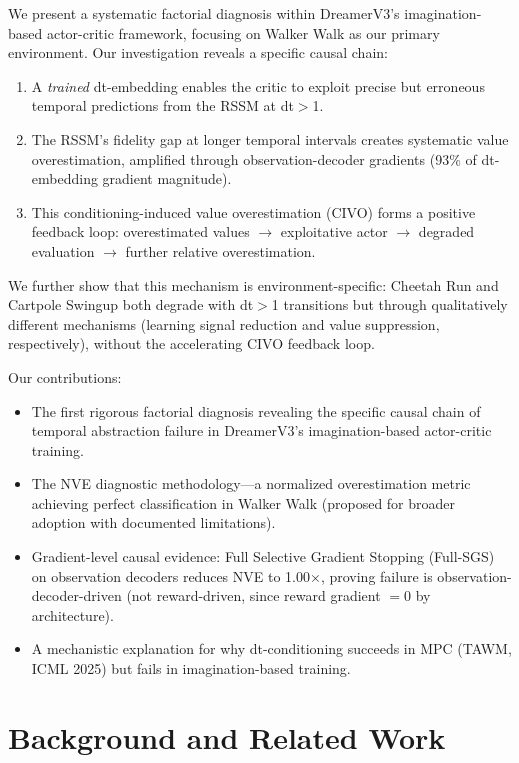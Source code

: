 \documentclass[10pt,letterpaper]{article}
\begin{document}
We present a systematic factorial diagnosis within DreamerV3's imagination-based actor-critic framework, focusing on Walker Walk as our primary environment. Our investigation reveals a specific causal chain:
\begin{enumerate}
    \item A \emph{trained} dt-embedding enables the critic to exploit precise but erroneous temporal predictions from the RSSM at dt$>$1.
    \item The RSSM's fidelity gap at longer temporal intervals creates systematic value overestimation, amplified through observation-decoder gradients (93\% of dt-embedding gradient magnitude).
    \item This conditioning-induced value overestimation (CIVO) forms a positive feedback loop: overestimated values $\rightarrow$ exploitative actor $\rightarrow$ degraded evaluation $\rightarrow$ further relative overestimation.
\end{enumerate}

We further show that this mechanism is environment-specific: Cheetah Run and Cartpole Swingup both degrade with dt$>$1 transitions but through qualitatively different mechanisms (learning signal reduction and value suppression, respectively), without the accelerating CIVO feedback loop.

Our contributions:
\begin{itemize}
    \item The first rigorous factorial diagnosis revealing the specific causal chain of temporal abstraction failure in DreamerV3's imagination-based actor-critic training.
    \item The NVE diagnostic methodology---a normalized overestimation metric achieving perfect classification in Walker Walk (proposed for broader adoption with documented limitations).
    \item Gradient-level causal evidence: Full Selective Gradient Stopping (Full-SGS) on observation decoders reduces NVE to 1.00$\times$, proving failure is observation-decoder-driven (not reward-driven, since reward gradient $= 0$ by architecture).
    \item A mechanistic explanation for why dt-conditioning succeeds in MPC (TAWM, ICML 2025) but fails in imagination-based training.
\end{itemize}

\section{Background and Related Work}
\end{document}
